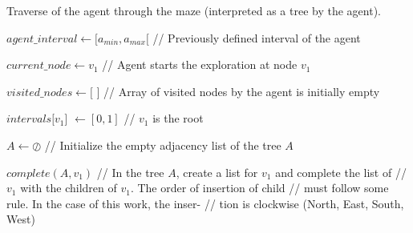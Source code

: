 \begin{algorithm}
\caption{Traverse of the agent through the maze (interpreted as a tree by the agent).}
\label{pseudocode_1}
\begin{algorithmic}

\State $agent\_interval \gets [a_{min},a_{max}[$ \hspace{0.5cm} \slash\slash \hspace{0.1cm} Previously defined interval of the agent

\State $current\_node \gets v_{1}$ \hspace{1cm} \slash\slash \hspace{0.1cm} Agent starts the exploration at node $v_{1}$

\State $visited\_nodes \gets [$ $]$ \hspace{0.95cm} \slash\slash \hspace{0.1cm} Array of visited nodes by the agent is initially empty

\State $intervals[v_{1}$] $\gets [0,1]$ \hspace{0.65cm} \slash\slash \hspace{0.1cm} $v_{1}$ is the root


\State $A \gets \oslash$ \hspace{3.1cm} \slash\slash \hspace{0.1cm} Initialize the empty adjacency list of the tree $A$

\State $complete(A, v_{1})$ \hspace{1.55cm} \slash\slash \hspace{0.1cm} In the tree $A$, create a list for $v_{1}$ and complete the list of
\State \hspace{4.45cm} \slash\slash \hspace{0.1cm} $v_{1}$ with the children of $v_{1}$. The order of insertion of child
\State \hspace{4.45cm} \slash\slash \hspace{0.1cm} must follow some rule. In the case of this work, the inser-
\State \hspace{4.45cm} \slash\slash \hspace{0.1cm} tion is clockwise (North, East, South, West)\\


\end{algorithmic}
\end{algorithm}
